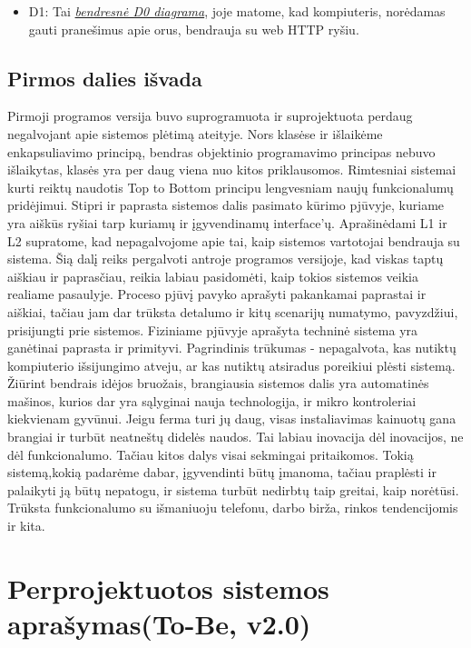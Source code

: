 \documentclass[oneside]{VUMIFPSkursinis}
\begin{document}
	\begin{itemize}
		\item D1: Tai \hyperref[fig:Deployment0]{\textit{bendresnė D0 diagrama}}, joje matome, kad kompiuteris, norėdamas gauti pranešimus apie orus,  bendrauja su web HTTP ryšiu.
	\end{itemize}

\subsection{Pirmos dalies išvada}
Pirmoji programos versija buvo suprogramuota ir suprojektuota perdaug negalvojant apie sistemos plėtimą ateityje. Nors klasėse ir išlaikėme enkapsuliavimo principą, bendras objektinio programavimo principas nebuvo išlaikytas, klasės yra per daug viena nuo kitos priklausomos. Rimtesniai sistemai kurti reiktų naudotis Top to Bottom principu lengvesniam naujų funkcionalumų pridėjimui. Stipri ir paprasta sistemos dalis pasimato kūrimo pjūvyje, kuriame yra aiškūs ryšiai tarp kuriamų ir įgyvendinamų interface'ų. Aprašinėdami L1 ir L2 supratome, kad nepagalvojome apie tai, kaip sistemos vartotojai bendrauja su sistema. Šią dalį reiks pergalvoti antroje programos versijoje, kad viskas taptų aiškiau ir paprasčiau, reikia labiau pasidomėti, kaip tokios sistemos veikia realiame pasaulyje. Proceso pjūvį pavyko aprašyti pakankamai paprastai ir aiškiai, tačiau jam dar trūksta detalumo ir kitų scenarijų numatymo, pavyzdžiui, prisijungti prie sistemos. Fiziniame pjūvyje aprašyta techninė sistema yra ganėtinai paprasta ir primityvi. Pagrindinis trūkumas - nepagalvota, kas nutiktų kompiuterio išsijungimo atveju, ar kas nutiktų atsiradus poreikiui plėsti sistemą. Žiūrint bendrais idėjos bruožais, brangiausia sistemos dalis yra automatinės mašinos, kurios dar yra sąlyginai nauja technologija, ir mikro kontroleriai kiekvienam gyvūnui. Jeigu ferma turi jų daug, visas instaliavimas kainuotų gana brangiai ir turbūt neatneštų didelės naudos. Tai labiau inovacija dėl inovacijos, ne dėl funkcionalumo. Tačiau kitos dalys visai sekmingai pritaikomos. Tokią sistemą,kokią padarėme dabar, įgyvendinti būtų įmanoma, tačiau praplėsti ir palaikyti ją būtų nepatogu, ir sistema turbūt nedirbtų taip greitai, kaip norėtūsi. Trūksta funkcionalumo su išmaniuoju telefonu, darbo birža, rinkos tendencijomis ir kita. 

\pagebreak

\section{Perprojektuotos sistemos aprašymas(To-Be, v2.0)}
\end{document}

